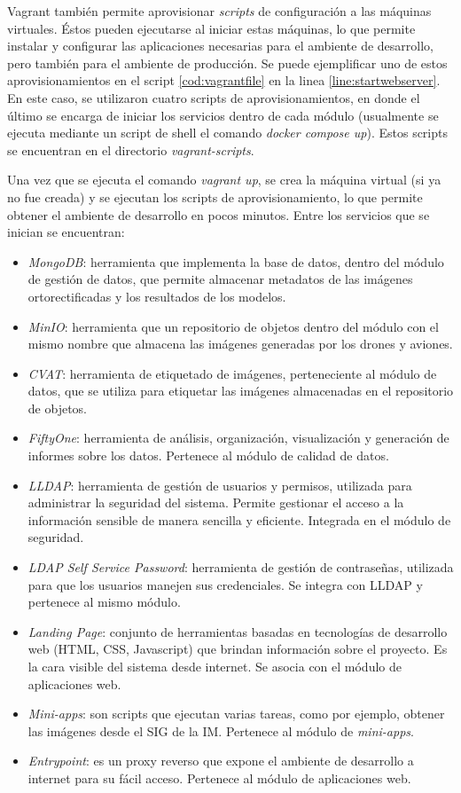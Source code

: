 Vagrant también permite aprovisionar \textit{scripts} de configuración a las máquinas virtuales. Éstos pueden ejecutarse al iniciar estas máquinas, lo que permite instalar y configurar las aplicaciones necesarias para el ambiente de desarrollo, pero también para el ambiente de producción. Se puede ejemplificar uno de estos aprovisionamientos en el script \ref{cod:vagrantfile} en la linea \ref{line:startwebserver}. En este caso, se utilizaron cuatro scripts de aprovisionamientos, en donde el último se encarga de iniciar los servicios dentro de cada módulo (usualmente se ejecuta mediante un script de shell el comando \textit{docker compose up}). Estos scripts se encuentran en el directorio \textit{vagrant-scripts}.

Una vez que se ejecuta el comando \textit{vagrant up}, se crea la máquina virtual (si ya no fue creada) y se ejecutan los scripts de aprovisionamiento, lo que permite obtener el ambiente de desarrollo en pocos minutos. Entre los servicios que se inician se encuentran:

\begin{itemize}
  \item \textit{MongoDB}: herramienta que implementa la base de datos, dentro del módulo de gestión de datos, que permite almacenar metadatos de las imágenes ortorectificadas y los resultados de los modelos.
  \item \textit{MinIO}: herramienta que un repositorio de objetos dentro del módulo con el mismo nombre que almacena las imágenes generadas por los drones y aviones.
  \item \textit{CVAT}: herramienta de etiquetado de imágenes, perteneciente al módulo de datos, que se utiliza para etiquetar las imágenes almacenadas en el repositorio de objetos.
  \item \textit{FiftyOne}: herramienta de análisis, organización, visualización y generación de informes sobre los datos. Pertenece al módulo de calidad de datos.
  \item \textit{LLDAP}: herramienta de gestión de usuarios y permisos, utilizada para administrar la seguridad del sistema. Permite gestionar el acceso a la información sensible de manera sencilla y eficiente. Integrada en el módulo de seguridad.
  \item \textit{LDAP Self Service Password}: herramienta de gestión de contraseñas, utilizada para que los usuarios manejen sus credenciales. Se integra con LLDAP y pertenece al mismo módulo.
  \item \textit{Landing Page}: conjunto de herramientas basadas en tecnologías de desarrollo web (HTML, CSS, Javascript) que brindan información sobre el proyecto. Es la cara visible del sistema desde internet. Se asocia con el módulo de aplicaciones web.
  \item \textit{Mini-apps}: son scripts que ejecutan varias tareas, como por ejemplo, obtener las imágenes desde el SIG de la IM. Pertenece al módulo de \textit{mini-apps}.
  \item \textit{Entrypoint}: es un proxy reverso que expone el ambiente de desarrollo a internet para su fácil acceso. Pertenece al módulo de aplicaciones web.
\end{itemize}


